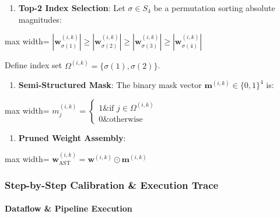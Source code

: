 \begin{enumerate}
\item \textbf{Top-2 Index Selection}:
Let $\sigma \in S_4$ be a permutation sorting absolute magnitudes:
\end{enumerate}
\begin{center}
\begin{adjustbox}{max width=\columnwidth}
$\displaystyle
\left| \mathbf{w}_{\sigma(1)}^{(i, k)} \right| \ge \left| \mathbf{w}_{\sigma(2)}^{(i, k)} \right| \ge \left| \mathbf{w}_{\sigma(3)}^{(i, k)} \right| \ge \left| \mathbf{w}_{\sigma(4)}^{(i, k)} \right|
$
\end{adjustbox}
\end{center}
Define index set $\Omega^{(i, k)} = \{ \sigma(1), \sigma(2) \}$.

\begin{enumerate}
\item \textbf{Semi-Structured Mask}:
The binary mask vector $\mathbf{m}^{(i, k)} \in \{0, 1\}^4$ is:
\end{enumerate}
\begin{center}
\begin{adjustbox}{max width=\columnwidth}
$\displaystyle
m_j^{(i, k)} = \begin{cases} 1 \& \text{if } j \in \Omega^{(i, k)} \\ 0 \& \text{otherwise} \end{cases}
$
\end{adjustbox}
\end{center}

\begin{enumerate}
\item \textbf{Pruned Weight Assembly}:
\end{enumerate}
\begin{center}
\begin{adjustbox}{max width=\columnwidth}
$\displaystyle
\mathbf{w}_{\text{AST}}^{(i, k)} = \mathbf{w}^{(i, k)} \odot \mathbf{m}^{(i, k)}
$
\end{adjustbox}
\end{center}


\subsubsection*{Step-by-Step Calibration \& Execution Trace}

\paragraph{Dataflow \& Pipeline Execution}

